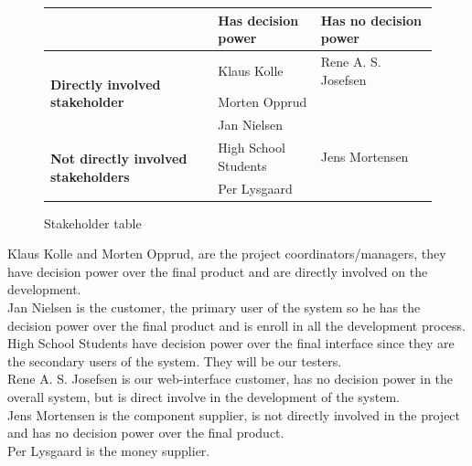 \begin{figure}[H]
 \begin{center}
  \begin{tabular}{| l | l | l |}
   \hline
    & \textbf{Has decision power} & \textbf{Has no decision power} \\ \hline
    \multirow{3}{*}{\textbf{Directly involved stakeholder}} 
    	& Klaus Kolle & Rene A. S. Josefsen\\ 
    	& Morten Opprud &  \\ 
    	& Jan Nielsen &  \\ \hline
    \multirow{2}{*}{\textbf{Not directly involved stakeholders}} 
    	& High School Students & Jens Mortensen\\
    	& Per Lysgaard & \\ \hline
   \end{tabular}
  \end{center}
 \caption{Stakeholder table}
\end{figure}

Klaus Kolle and Morten Opprud, are the project coordinators/managers, they
have decision power over the final product and are directly involved on the
development.\\
\newline
Jan Nielsen is the customer, the primary user of the system so he has the
decision power over the final product and is enroll in all the development
process.\\
\newline
High School Students have decision power over the final interface since they
are the secondary users of the system. They will be our testers.\\
\newline
Rene A. S. Josefsen is our web-interface customer, has no decision power in the
overall system, but is direct involve in the development of the system.\\
\newline
Jens Mortensen is the component supplier, is not directly involved in the
project and has no decision power over the final product.\\
\newline
Per Lysgaard is the money supplier.\\
\newline

